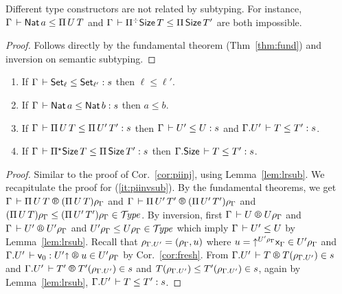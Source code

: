 \documentclass[acmlarge,review,anonymous]{acmart}\settopmatter{printfolios=true}
\begin{document}
\begin{lemma}
  \label{lem:discr}
  Different type constructors are not related by subtyping.  For instance,
  $\Gamma \der \Nat a \leq \piT U T$ and
  $\Gamma \der \erpiT \Size T \leq \piT \Size T'$ are both impossible.
\end{lemma}
\begin{proof}
  Follows directly by the fundamental theorem (Thm~\ref{thm:fund}) and inversion on semantic subtyping.
\end{proof}



\begin{lemma}
\label{lem:invsubty}
\bla
\begin{enumerate}
\item \label{it:setinvsub}
  If $\Gamma \der \Set[\ell] \leq \Set[\ell'] : s$ then $\ell \leq \ell'$.
\item \label{it:natinvsub}
  If $\Gamma \der \Nat a \leq \Nat b : s$ then $a \leq b$.
\item \label{it:piinvsub}
  If $\Gamma \der \piT U T \leq \piT{U'}{T'} : s$ then
  $\Gamma \der U' \leq U : s$ and
  $\cext \Gamma {U'} \der T \leq T' : s$.
\item \label{it:allinvsub}
  If $\Gamma \der \epiT \Size T \leq \piT{\Size}{T'} : s$ then
  $\cext \Gamma \Size \der T \leq T' : s$.
\end{enumerate}
\end{lemma}
\begin{proof}
Similar to the proof of Cor.~\ref{cor:piinj}, using Lemma~\ref{lem:lrsub}.
We recapitulate the proof for (\ref{it:piinvsub}).
By the fundamental theorems, we get
$\RG \Gamma {\piT U T} {(\piT U T)\rhog}$ and
$\RG \Gamma {\piT {U'} {T'}} {(\piT {U'} {T'})\rhog}$ and
${(\piT U T)\rhog} \leq {(\piT {U'} {T'})\rhog} \in \TYPE$.
By inversion, first
$\RG \Gamma U {U\rhog}$ and
$\RG \Gamma {U'} {U'\rhog}$ and
$U'\rhog \leq U\rhog \in \TYPE$ which imply $\Gamma \der U' \leq U$ by Lemma~\ref{lem:lrsub}.
Recall that
$\rhogup = (\rhog, u)$ where
$u = \up{U'\rhog} \var\Gamma \in U'\rhog$ and
$\LR {\cext \Gamma U'} {\ind0} {U'\slift} {u} {U'\rhog}$ by Cor.~\ref{cor:fresh}.
From
$\LRTS {\cext \Gamma U'} T {T(\rhogup)} s$ and
$\LRTS {\cext \Gamma U'} {T'} {T'(\rhogup)} s$ and
$T(\rhogup) \leq T'(\rhogup) \in s$, again by Lemma~\ref{lem:lrsub},
$\cext \Gamma {U'} \der T \leq T' : s$.
\end{proof}
\end{document}
